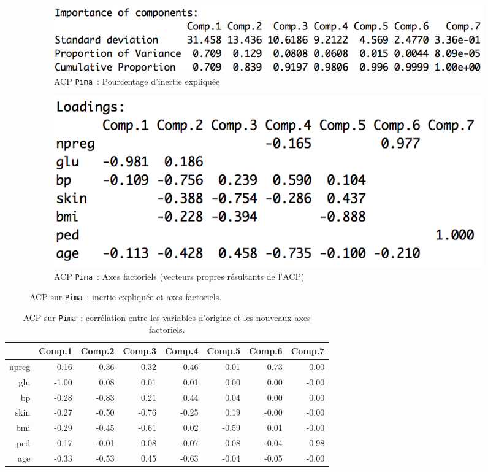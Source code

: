 \documentclass[a4paper,11pt]{report}
\begin{document}
\begin{figure}[H]
	\centering
	\captionsetup{justification=centering, margin=1cm}
	\begin{subfigure}[b]{0.45\linewidth}
		\centering
		\captionsetup{justification=centering, margin=0cm}
		\includegraphics[width=1\columnwidth]{img/2-4-ACP-Pima-Pourcentage-Inertie-Expliquee}
		\caption{\scriptsize ACP \texttt{Pima}~: Pourcentage d'inertie expliquée}
		\label{fig:2-4-ACP-Pima-Pourcentage-Inertie-Expliquee}
	\end{subfigure}%
	\begin{subfigure}[b]{0.45\linewidth}
		\centering
		\captionsetup{justification=centering, margin=0cm}
		\includegraphics[width=.8\columnwidth]{img/2-4-ACP-Pima-Axes-Factoriels}
		\caption{\scriptsize ACP \texttt{Pima}~: Axes factoriels (vecteurs propres résultants de l'ACP)}
		\label{fig:2-4-ACP-Pima-Axes-Factoriels}
	\end{subfigure}%
	\caption{
		\small ACP sur \texttt{Pima}~: inertie expliquée et axes factoriels.
	}
	\label{fig:ACP-Pima-inertie-et-axes-factoriels}%
\end{figure}




\begin{table}[H]
	\centering
	\captionsetup{justification=centering, margin=2cm}
	\caption{ACP sur \texttt{Pima}~: corrélation entre les variables d'origine et les nouveaux axes factoriels.}
	\begin{tabular}{r|rrrrrrr}
		& Comp.1 & Comp.2 & Comp.3 & Comp.4 & Comp.5 & Comp.6 & Comp.7 \\ 
		\hline
		npreg & -0.16 & -0.36 & 0.32 & -0.46 & 0.01 & 0.73 & 0.00 \\ 
		glu & -1.00 & 0.08 & 0.01 & 0.01 & 0.00 & 0.00 & -0.00 \\ 
		bp & -0.28 & -0.83 & 0.21 & 0.44 & 0.04 & 0.00 & 0.00 \\ 
		skin & -0.27 & -0.50 & -0.76 & -0.25 & 0.19 & -0.00 & -0.00 \\ 
		bmi & -0.29 & -0.45 & -0.61 & 0.02 & -0.59 & 0.01 & -0.00 \\ 
		ped & -0.17 & -0.01 & -0.08 & -0.07 & -0.08 & -0.04 & 0.98 \\ 
		age & -0.33 & -0.53 & 0.45 & -0.63 & -0.04 & -0.05 & -0.00 \\ 
	\end{tabular}
	\label{table:correlation-acp-pima}
\end{table}
\end{document}
